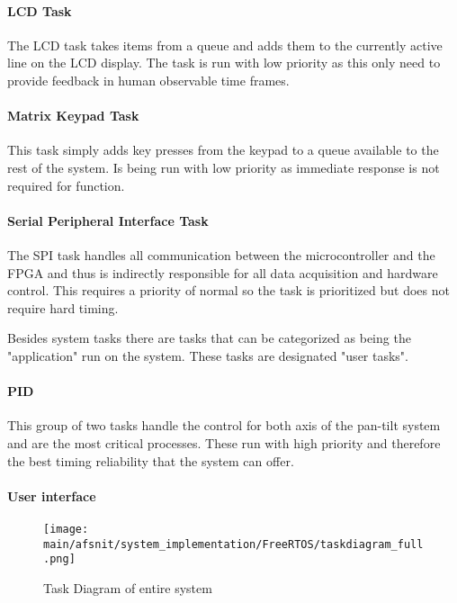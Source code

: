 \documentclass[../../../main]{subfiles}
\begin{document}
\paragraph{LCD Task}

The LCD task takes items from a queue and adds them to the currently active line on the LCD display. The task is run with low priority as this only need to provide feedback in human observable time frames.

\paragraph{Matrix Keypad Task}

This task simply adds key presses from the keypad to a queue available to the rest of the system. Is being run with low priority as immediate response is not required for function.

\paragraph{Serial Peripheral Interface Task}

The SPI task handles all communication between the microcontroller and the FPGA and thus is indirectly responsible for all data acquisition and hardware control. This requires a priority of normal so the task is prioritized but does not require hard timing.

Besides system tasks there are tasks that can be categorized as being the "application" run on the system. These tasks are designated "user tasks".

\paragraph{PID}

This group of two tasks handle the control for both axis of the pan-tilt system and are the most critical processes. These run with high priority and therefore the best timing reliability that the system can offer.

\paragraph{User interface}


\begin{figure}[H]
\texttt{[image: \\main/afsnit/system\_implementation/FreeRTOS/taskdiagram\_full.png]}
\caption{Task Diagram of entire system}
\label{fig:entire_task_diagram}
\end{figure}
\end{document}
